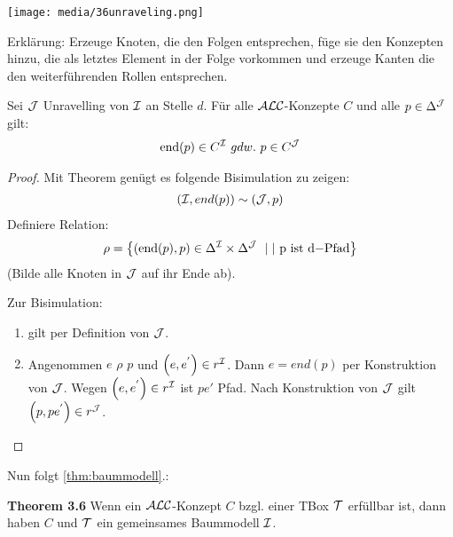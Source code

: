 \texttt{[image: media/36unraveling.png]}

Erklärung: Erzeuge Knoten, die den Folgen entsprechen, füge sie den
Konzepten hinzu, die als letztes Element in der Folge vorkommen und
erzeuge Kanten die den weiterführenden Rollen entsprechen.

\begin{lemma}[Unravelling]
    \label{lemma37}
    \label{lem:unravelling}
Sei $\mathcal{J}$ Unravelling von $\mathcal{I}$ an Stelle $d$. Für alle $\mathcal{A}\mathcal{L}\mathcal{C}$-Konzepte $C$ und alle $p \in \Delta^{\mathcal{J}}$ gilt:
\begin{align*}
\text{end}\left( p \right) \in C^\MI\ gdw.\ p \in C^{\MJ}
\end{align*}
\end{lemma}

\begin{tafel}
\begin{proof}
Mit Theorem genügt es folgende Bisimulation zu zeigen:
\begin{align*}
\left( \MI,end\left( p \right) \right)\sim\left( \MJ,p \right)\\
\end{align*}
Definiere Relation:
\begin{align*}
\rho = \left\{ \left( \text{end}\left( p \right),p \right) \in \Delta^\MI
        \times \Delta^{\MJ}\  \mid|\text{\ p\ }\mathrm{\text{ist}}\text{\ d}\mathrm{- Pfad}\right\}
\end{align*}
(Bilde alle Knoten in $\mathcal{J}$ auf ihr Ende ab). 

Zur Bisimulation:
\begin{enumerate}
\item gilt per Definition von $\mathcal{J}$.
\item
  Angenommen $e$ $\rho$ $p$ und
  $\left( e,e^{'} \right) \in r^\MI$. Dann $e = end\left( p \right)$
  per Konstruktion von $\mathcal{J}$. Wegen $\left( e,e^{'} \right) \in r^\MI$
  ist $pe'$ Pfad. Nach Konstruktion von $\mathcal{J}$ gilt
  $\left( p,pe^{'} \right) \in r^{\MJ}$.
\end{enumerate}
\end{proof}
\end{tafel}

Nun folgt \autoref{thm:baummodell}.:

\textbf{Theorem 3.6} Wenn ein $\mathcal{A}\mathcal{L}\mathcal{C}$-Konzept $C$ bzgl. einer TBox $\mathcal{T}$ erfüllbar ist, dann haben $C$ und $\mathcal{T}$ ein gemeinsames Baummodell $\mathcal{I}$.

